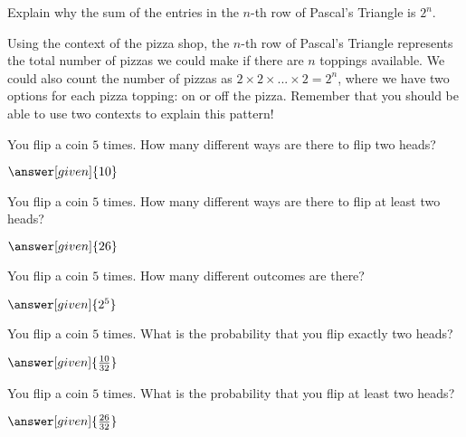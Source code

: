 \documentclass[nooutcomes]{ximera}
\begin{document}
\begin{problem}
Explain why the sum of the entries in the $n$-th row of Pascal's Triangle is $2^n$.
\begin{freeResponse}
	\begin{hint}
		Using the context of the pizza shop, the $n$-th row of Pascal's Triangle represents the total number of pizzas we could make if there are $n$ toppings available.  We could also count the number of pizzas as $2 \times 2 \times ... \times 2 = 2^n$, where we have two options for each pizza topping: on or off the pizza.  Remember that you should be able to use two contexts to explain this pattern!
	\end{hint}
\end{freeResponse}
\end{problem}



\begin{problem}
	You flip a coin $5$ times.  How many different ways are there to flip two heads?
	\begin{prompt}
		$\answer[given]{10}$
	\end{prompt}
\end{problem}

\begin{problem}
	You flip a coin $5$ times.  How many different ways are there to flip at least two heads?
	\begin{prompt}
		$\answer[given]{26}$
	\end{prompt}
\end{problem}


\begin{problem}
	You flip a coin $5$ times.  How many different outcomes are there?
	\begin{prompt}
		$\answer[given]{2^5}$
	\end{prompt}
\end{problem}


\begin{problem}
	You flip a coin $5$ times.  What is the probability that you flip exactly two heads?
	\begin{prompt}
		$\answer[given]{\frac{10}{32}}$
	\end{prompt}
\end{problem}


\begin{problem}
	You flip a coin $5$ times.  What is the probability that you flip at least two heads?
	\begin{prompt}
		$\answer[given]{\frac{26}{32}}$
	\end{prompt}
\end{problem}
\end{document}
